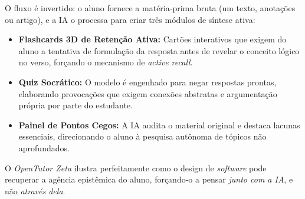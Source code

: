 O fluxo é invertido: o aluno fornece a matéria-prima bruta (um texto, anotações ou artigo), e a IA o processa para criar três módulos de síntese ativa:
\begin{itemize}
    \item \textbf{Flashcards 3D de Retenção Ativa:} Cartões interativos que exigem do aluno a tentativa de formulação da resposta antes de revelar o conceito lógico no verso, forçando o mecanismo de \textit{active recall}.
    \item \textbf{Quiz Socrático:} O modelo é engenhado para negar respostas prontas, elaborando provocações que exigem conexões abstratas e argumentação própria por parte do estudante.
    \item \textbf{Painel de Pontos Cegos:} A IA audita o material original e destaca lacunas essenciais, direcionando o aluno à pesquisa autônoma de tópicos não aprofundados.
\end{itemize}
O \textit{OpenTutor Zeta} ilustra perfeitamente como o design de \textit{software} pode recuperar a agência epistêmica do aluno, forçando-o a pensar \textit{junto com a IA}, e não \textit{através dela}.
